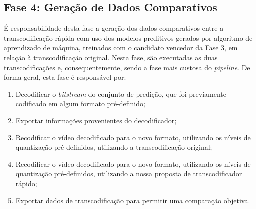 \subsection{Fase 4: Geração de Dados Comparativos}
\label{cap:7.2.4}

É responsabilidade desta fase a geração dos dados comparativos entre a transcodificação rápida com uso dos modelos preditivos gerados por algoritmo de aprendizado de máquina, treinados com o candidato vencedor da Fase 3, em relação à transcodificação original. Nesta fase, são executadas as duas transcodificações e, consequentemente, sendo a fase mais custosa do \textit{pipeline}. De forma geral, esta fase é responsável por:

\begin{enumerate}[1.]
    \item Decodificar o \textit{bitstream} do conjunto de predição, que foi previamente codificado em algum formato pré-definido;

    \item Exportar informações provenientes do decodificador;

    \item Recodificar o vídeo decodificado para o novo formato, utilizando os níveis de quantização pré-definidos, utilizando a transcodificação original;

    \item Recodificar o vídeo decodificado para o novo formato, utilizando os níveis de quantização pré-definidos, utilizando a nossa proposta de transcodificador rápido;

    \item Exportar dados de transcodificação para permitir uma comparação objetiva.
\end{enumerate}
